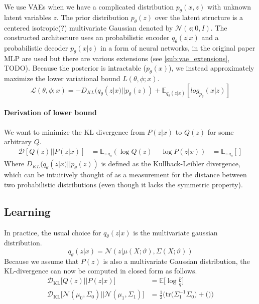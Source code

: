 \documentclass[twoside,11pt,a4paper]{article}
\theoremstyle{break}
\begin{document}
We use VAEs when we have a complicated distribution $p_\theta(x,z)$ with unknown latent variables $z$.
The prior distribution $p_\theta(z)$ over the latent structure is a centered isotropic(?) multivariate Gaussian denoted by $\mathcal{N}(z;0, I)$.
The constructed architecture uses an probabilistic encoder $q_\theta(z|x)$ and a probabilistic decoder $p_\theta(x|z)$ in a form of neural networks, in the original paper MLP are used\cite{vae:2013} but there are various extensions (see \ref{sub:vae_extensions}, TODO).
Because the posterior is intractable ($p_\theta(x)$), we instead approximately maximize the lower variational bound $L(\theta,\phi;x)$.\\
\begin{equation}
  \mathcal{L}(\theta,\phi;x) = -D_{KL}(q_\theta(z|x)||p_\theta(z)) + \mathbb{E}_{q_\theta(z|x)}[log_{p_\theta}(x|z)]
\end{equation}
\paragraph{Derivation of lower bound}
We want to minimize the KL divergence from $P(z|x)$ to $Q(z)$ for some arbitrary $Q$.
  \begin{align*}
    \label{eq:der_lower_bound}
    \mathcal{D}[Q(z)||P(z|x)] &= \mathbb{E}_{z~q_\theta}(\log Q(z) - \log P(z|x))
    &= \mathbb{E}_{z ~ q_\theta}[]
  \end{align*}
Where $D_{KL}(q_\theta(z|x) || p_\theta(z))$ is defined as the Kullback-Leibler divergence, which can be intuitively thought of as a measurement for the distance between two probabilistic distributions (even though it lacks the symmetric property).





\subsection{Learning}
\label{sub:vae_learning}
In practice, the usual choice for $q_\theta(z|x)$ is the multivariate gaussian distribution.
$$
q_\theta(z|x) = \mathcal{N}(z|\mu(X;\vartheta), \Sigma(X;\vartheta))
$$
Because we assume that $P(z)$ is also a multivariate Gaussian distribution, the KL-divergence can now be computed in closed form as follows\cite{derivations:2007}.
\begin{align*}
  \mathcal{D}_{\mathrm{KL}}\big[Q(z) || P(z|x)\big] &= \mathbb{E}\big[\log \frac{p}{q}\big]\\
  \mathcal{D}_{\mathrm{KL}}\big[\mathcal{N}(\mu_0,\Sigma_0) || \mathcal{N}(\mu_1,\Sigma_1)\big]
  &= \frac{1}{2} \big(\mathrm{tr}\big(\Sigma_1^{-1}\Sigma_0\big) + \big(\big)\big)
\end{align*}
\end{document}

